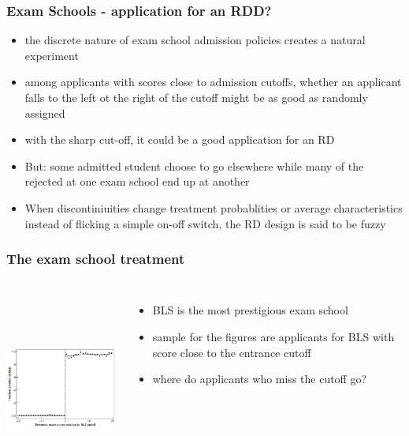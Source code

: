 \documentclass{beamer}
\begin{document}
\begin{frame}
\frametitle{Exam Schools - application for an RDD?}
\begin{itemize}
\item the discrete nature of exam school admission policies creates a natural experiment
\item among applicants with scores close to admission cutoffs, whether an applicant falls to the left ot the right of the cutoff might be as good as randomly assigned
\item with the sharp cut-off, it could be a good application for an RD
\item But: some admitted student choose to go elsewhere while many of the rejected at one exam school end up at another
\item When discontiniuities change treatment probablities or average characteristics instead of flicking a simple on-off switch, the RD design is said to be fuzzy
\end{itemize}
\end{frame}


\begin{frame}
\frametitle{The exam school treatment}
\begin{columns}
\includegraphics[width=6cm,height=6.5cm,keepaspectratio]{Figure 4.6} 

\begin{itemize}
	\item BLS is the most prestigious exam school
	\item sample for the figures are applicants for BLS with score close to the entrance cutoff
	\item where do applicants who miss the cutoff go?
	
\end{itemize}
\end{columns}	
\end{frame}
\end{document}
